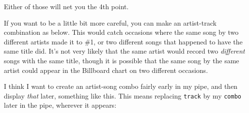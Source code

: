\documentclass[]{tufte-book}
\newenvironment{Shaded}{}{}
\newcommand{\DataTypeTok}[1]{\textcolor[rgb]{0.56,0.13,0.00}{#1}}
\newcommand{\DecValTok}[1]{\textcolor[rgb]{0.25,0.63,0.44}{#1}}
\newcommand{\KeywordTok}[1]{\textcolor[rgb]{0.00,0.44,0.13}{\textbf{#1}}}
\newcommand{\NormalTok}[1]{#1}
\newcommand{\OperatorTok}[1]{\textcolor[rgb]{0.40,0.40,0.40}{#1}}
\newcommand{\StringTok}[1]{\textcolor[rgb]{0.25,0.44,0.63}{#1}}
\theoremstyle{definition}
\theoremstyle{definition}
\theoremstyle{definition}
\theoremstyle{remark}
\begin{document}
Either of those will net you the 4th point.

If you want to be a little bit more careful, you can make an
artist-track combination as below. This would catch occasions where the
same song by two different artists made it to \#1, or two different
songs that happened to have the same title did. It's not very likely
that the same artist would record two \emph{different} songs with the
same title, though it is possible that the same song by the same artist
could appear in the Billboard chart on two different occasions.

I think I want to create an artist-song combo fairly early in my pipe,
and then display \emph{that} later, something like this. This means
replacing \texttt{track} by my \texttt{combo} later in the pipe,
wherever it appears:

\begin{Shaded}
\end{Shaded}
\end{document}
